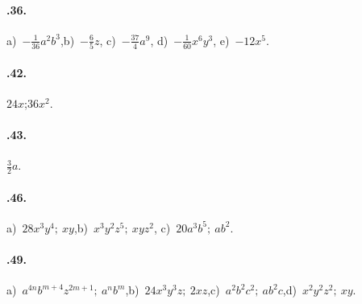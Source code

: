 \paragraph{\thechapter.36.} a)~$-\frac{1}{36}a^{2}b^{3}$,\quad b)~$-\frac{6}{5}z$, \quad c)~$-\frac{37}{4}a^{9}$, \quad d)~$-\frac{1}{60}x^{6}y^{3}$, \quad e)~$-12x^{5}$.
\paragraph{\thechapter.42.} $24x$;\:$36x^2$.
\paragraph{\thechapter.43.} $\frac{3}{2}a$.
\paragraph{\thechapter.46.} a)~$28x^{3}y^{4};\:xy$,\quad b)~$x^{3}y^{2}z^{5};\:xyz^{2}$, \quad c)~$20a^{3}b^{5};\:ab^{2}$.
\paragraph{\thechapter.49.} a)~$a^{4n}b^{m+4}z^{2m+1};\:a^{n}b^{m}$,\quad b)~$24x^{3}y^{3}z;\:2xz$,\quad c)~$a^{2}b^{2}c^{2};\:ab^{2}c$,\quad d)~$x^{2}y^{2}z^{2};\:xy$.
